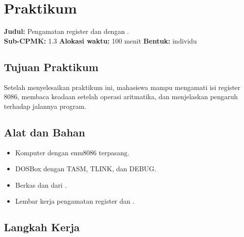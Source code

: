 \section{Praktikum}
\label{sec:praktikum-bab5}

\begin{praktikumbox}
\vspace{1.1em}
\textbf{Judul:} Pengamatan register dan  dengan
.\\[0.3em]
\textbf{Sub-CPMK:} 1.3 \quad\textbullet\quad
\textbf{Alokasi waktu:} 100 menit \quad\textbullet\quad
\textbf{Bentuk:} individu
\end{praktikumbox}

\subsection{Tujuan Praktikum}

Setelah menyelesaikan praktikum ini, mahasiswa mampu mengamati isi
register 8086, membaca keadaan  setelah operasi
aritmatika, dan menjelaskan pengaruh  terhadap jalannya
program.

\subsection{Alat dan Bahan}

\begin{itemize}
    \item Komputer dengan emu8086 terpasang.
    \item DOSBox dengan TASM, TLINK, dan DEBUG.
    \item Berkas  dan 
          dari .
    \item Lembar kerja pengamatan register dan .
\end{itemize}

\subsection{Langkah Kerja}

